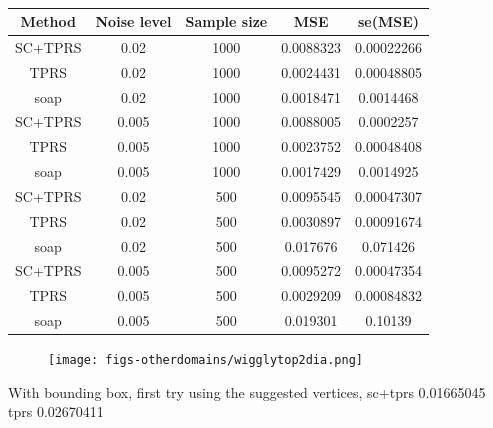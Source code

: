 \documentclass[a4paper,10pt]{amsart}
\begin{document}
\begin{table}[ht]
\begin{tabular}{c c c c c}\\
Method & Noise level & Sample size & MSE & se(MSE)\\
\hline
\hline
SC+TPRS & 0.02 & 1000 & 0.0088323 & 0.00022266\\
TPRS & 0.02 & 1000 & 0.0024431 & 0.00048805\\
soap & 0.02 & 1000 & 0.0018471 & 0.0014468\\
SC+TPRS & 0.005 & 1000 & 0.0088005 & 0.0002257\\
TPRS & 0.005 & 1000 & 0.0023752 & 0.00048408\\
soap & 0.005 & 1000 & 0.0017429 & 0.0014925\\
SC+TPRS & 0.02 & 500 & 0.0095545 & 0.00047307\\
TPRS & 0.02 & 500 & 0.0030897 & 0.00091674\\
soap & 0.02 & 500 & 0.017676 & 0.071426\\
SC+TPRS & 0.005 & 500 & 0.0095272 & 0.00047354\\
TPRS & 0.005 & 500 & 0.0029209 & 0.00084832\\
soap & 0.005 & 500 & 0.019301 & 0.10139\\
\end{tabular}
\caption{}
\label{}
\end{table}

\begin{figure}
\centering
\texttt{[image: figs-otherdomains/wigglytop2dia.png]} \\
\caption{}
\label{wigglytop2dia}
\end{figure}




With bounding box, first try using the suggested vertices, 
sc+tprs 0.01665045 
tprs 0.02670411 


\end{document}
